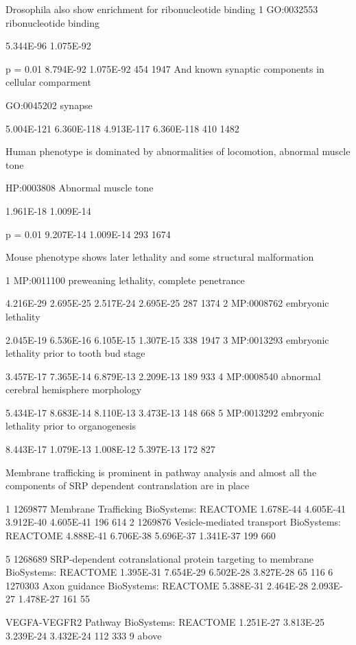 Drosophila also show enrichment for ribonucleotide binding 
1 
GO:0032553 
ribonucleotide binding 

5.344E-96 
1.075E-92

p = 0.01 
8.794E-92 
1.075E-92 
454 
1947
And known synaptic components in cellular comparment


GO:0045202 
synapse 

5.004E-121 
6.360E-118 
4.913E-117 
6.360E-118 
410 
1482

Human phenotype is dominated by abnormalities of locomotion, abnormal muscle tone


HP:0003808 
Abnormal muscle tone 

1.961E-18 
1.009E-14 

p = 0.01
9.207E-14 
1.009E-14 
293 
1674

Mouse phenotype shows later lethality and some structural malformation


1 
MP:0011100 
preweaning lethality, complete penetrance 

4.216E-29 
2.695E-25 
2.517E-24 
2.695E-25 
287 
1374 
2 
MP:0008762 
embryonic lethality 

2.045E-19 
6.536E-16 
6.105E-15 
1.307E-15 
338 
1947 
3 
MP:0013293 
embryonic lethality prior to tooth bud stage 

3.457E-17 
7.365E-14 
6.879E-13 
2.209E-13 
189 
933 
4 
MP:0008540 
abnormal cerebral hemisphere morphology 

5.434E-17 
8.683E-14 
8.110E-13 
3.473E-13 
148 
668 
5 
MP:0013292 
embryonic lethality prior to organogenesis 

8.443E-17 
1.079E-13 
1.008E-12 
5.397E-13 
172 
827


Membrane trafficking is prominent in pathway analysis and almost all the components of SRP dependent contranslation are in place


1 
1269877 
Membrane Trafficking 
BioSystems: REACTOME 
1.678E-44 
4.605E-41 
3.912E-40 
4.605E-41 
196 
614 
2 
1269876 
Vesicle-mediated transport 
BioSystems: REACTOME 
4.888E-41 
6.706E-38 
5.696E-37 
1.341E-37 
199 
660

5 
1268689 
SRP-dependent cotranslational protein targeting to membrane 
BioSystems: REACTOME 
1.395E-31 
7.654E-29 
6.502E-28 
3.827E-28 
65 
116 
6 
1270303 
Axon guidance 
BioSystems: REACTOME 
5.388E-31 
2.464E-28 
2.093E-27 
1.478E-27 
161 
55

VEGFA-VEGFR2 Pathway 
BioSystems: REACTOME 
1.251E-27 
3.813E-25 
3.239E-24 
3.432E-24 
112 
333
9 above

